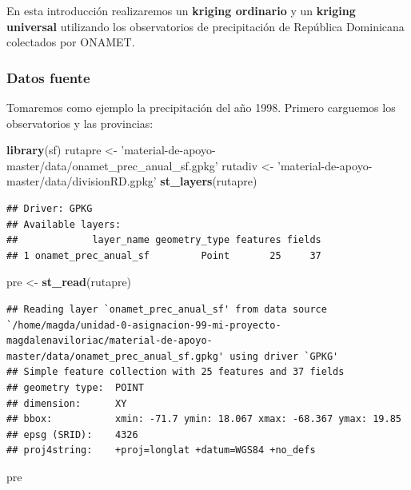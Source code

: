 \documentclass[11pt,]{article}
\newenvironment{Shaded}{\begin{snugshade}}{\end{snugshade}}
\newcommand{\KeywordTok}[1]{\textcolor[rgb]{0.13,0.29,0.53}{\textbf{#1}}}
\newcommand{\StringTok}[1]{\textcolor[rgb]{0.31,0.60,0.02}{#1}}
\newcommand{\NormalTok}[1]{#1}
\begin{document}
En esta introducción realizaremos un \textbf{kriging ordinario} y un
\textbf{kriging universal} utilizando los observatorios de precipitación
de República Dominicana colectados por ONAMET.

\subsubsection{Datos fuente}\label{datos-fuente}

Tomaremos como ejemplo la precipitación del año 1998. Primero carguemos
los observatorios y las provincias:

\begin{Shaded}
\begin{Highlighting}[]
\KeywordTok{library}\NormalTok{(sf)}
\NormalTok{rutapre <-}\StringTok{ 'material-de-apoyo-master/data/onamet_prec_anual_sf.gpkg'}
\NormalTok{rutadiv <-}\StringTok{ 'material-de-apoyo-master/data/divisionRD.gpkg'}
\KeywordTok{st_layers}\NormalTok{(rutapre)}
\end{Highlighting}
\end{Shaded}

\begin{verbatim}
## Driver: GPKG 
## Available layers:
##             layer_name geometry_type features fields
## 1 onamet_prec_anual_sf         Point       25     37
\end{verbatim}

\begin{Shaded}
\begin{Highlighting}[]
\NormalTok{pre <-}\StringTok{ }\KeywordTok{st_read}\NormalTok{(rutapre)}
\end{Highlighting}
\end{Shaded}

\begin{verbatim}
## Reading layer `onamet_prec_anual_sf' from data source `/home/magda/unidad-0-asignacion-99-mi-proyecto-magdalenaviloriac/material-de-apoyo-master/data/onamet_prec_anual_sf.gpkg' using driver `GPKG'
## Simple feature collection with 25 features and 37 fields
## geometry type:  POINT
## dimension:      XY
## bbox:           xmin: -71.7 ymin: 18.067 xmax: -68.367 ymax: 19.85
## epsg (SRID):    4326
## proj4string:    +proj=longlat +datum=WGS84 +no_defs
\end{verbatim}

\begin{Shaded}
\begin{Highlighting}[]
\NormalTok{pre}
\end{Highlighting}
\end{Shaded}
\end{document}
